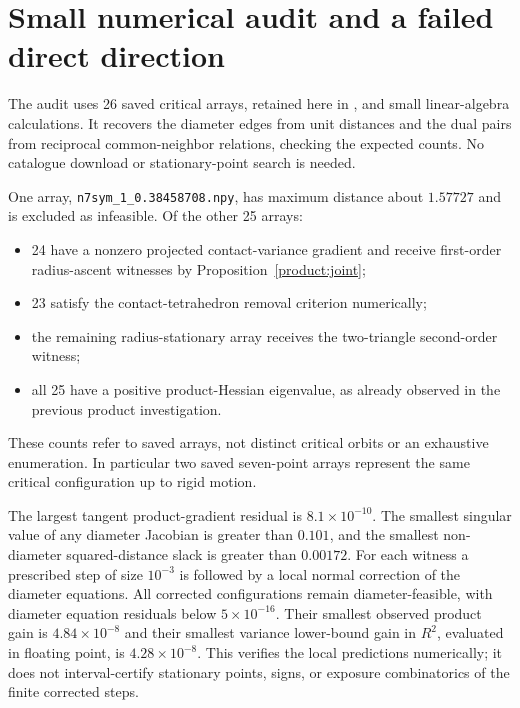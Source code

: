 \documentclass[11pt]{article}
\theoremstyle{remark}\newtheorem{remark}[theorem]{Remark}
\begin{document}
\section{Small numerical audit and a failed direct direction}
The audit uses 26 saved critical arrays, retained here in , and small linear-algebra calculations.
It recovers the diameter edges from unit distances and the dual pairs
from reciprocal common-neighbor relations, checking the expected counts.
No catalogue download or stationary-point search is needed.

One array, \texttt{n7sym\_1\_0.38458708.npy}, has maximum distance
about $1.57727$ and is excluded as infeasible. Of the other 25 arrays:
\begin{itemize}
\item 24 have a nonzero projected contact-variance gradient and receive
      first-order radius-ascent witnesses by Proposition~\ref{product:joint};
\item 23 satisfy the contact-tetrahedron removal criterion numerically;
\item the remaining radius-stationary array receives the two-triangle
      second-order witness;
\item all 25 have a positive product-Hessian eigenvalue, as already
      observed in the previous product investigation.
\end{itemize}
These counts refer to saved arrays, not distinct critical orbits or
an exhaustive enumeration. In particular two saved seven-point arrays
represent the same critical configuration up to rigid motion.

The largest tangent product-gradient residual is
$8.1\times10^{-10}$. The smallest singular value of any diameter
Jacobian is greater than $0.101$, and the smallest non-diameter
squared-distance slack is greater than $0.00172$.
For each witness a prescribed step of size $10^{-3}$ is followed by
a local normal correction of the diameter equations. All corrected
configurations remain diameter-feasible, with diameter equation
residuals below $5\times10^{-16}$. Their smallest observed product
gain is $4.84\times10^{-8}$ and their smallest variance lower-bound
gain in $R^2$, evaluated in floating point, is
$4.28\times10^{-8}$. This verifies the local predictions numerically;
it does not interval-certify stationary points, signs, or exposure
combinatorics of the finite corrected steps.
\end{document}
